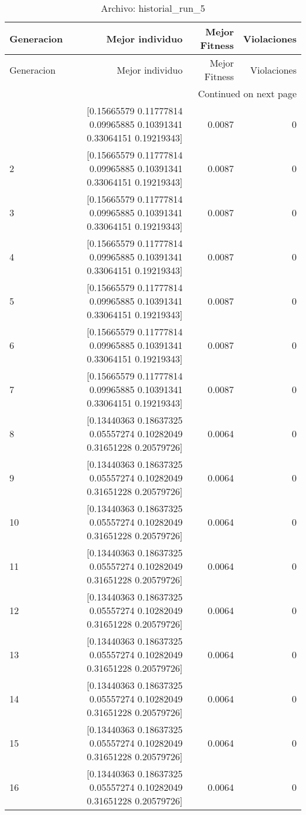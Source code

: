 \begin{longtable}{lrrr}
\caption{Archivo: historial\_run\_5}\label{tab:historial_run_5} \\
\toprule
Generacion & Mejor individuo & Mejor Fitness & Violaciones \\
\midrule
\endfirsthead
\toprule
Generacion & Mejor individuo & Mejor Fitness & Violaciones \\
\midrule
\endhead
\midrule
\multicolumn{4}{r}{Continued on next page} \\
\midrule
\endfoot
\bottomrule
\endlastfoot
1 & [0.15665579 0.11777814 0.09965885 0.10391341 0.33064151 0.19219343] & 0.0087 & 0 \\
2 & [0.15665579 0.11777814 0.09965885 0.10391341 0.33064151 0.19219343] & 0.0087 & 0 \\
3 & [0.15665579 0.11777814 0.09965885 0.10391341 0.33064151 0.19219343] & 0.0087 & 0 \\
4 & [0.15665579 0.11777814 0.09965885 0.10391341 0.33064151 0.19219343] & 0.0087 & 0 \\
5 & [0.15665579 0.11777814 0.09965885 0.10391341 0.33064151 0.19219343] & 0.0087 & 0 \\
6 & [0.15665579 0.11777814 0.09965885 0.10391341 0.33064151 0.19219343] & 0.0087 & 0 \\
7 & [0.15665579 0.11777814 0.09965885 0.10391341 0.33064151 0.19219343] & 0.0087 & 0 \\
8 & [0.13440363 0.18637325 0.05557274 0.10282049 0.31651228 0.20579726] & 0.0064 & 0 \\
9 & [0.13440363 0.18637325 0.05557274 0.10282049 0.31651228 0.20579726] & 0.0064 & 0 \\
10 & [0.13440363 0.18637325 0.05557274 0.10282049 0.31651228 0.20579726] & 0.0064 & 0 \\
11 & [0.13440363 0.18637325 0.05557274 0.10282049 0.31651228 0.20579726] & 0.0064 & 0 \\
12 & [0.13440363 0.18637325 0.05557274 0.10282049 0.31651228 0.20579726] & 0.0064 & 0 \\
13 & [0.13440363 0.18637325 0.05557274 0.10282049 0.31651228 0.20579726] & 0.0064 & 0 \\
14 & [0.13440363 0.18637325 0.05557274 0.10282049 0.31651228 0.20579726] & 0.0064 & 0 \\
15 & [0.13440363 0.18637325 0.05557274 0.10282049 0.31651228 0.20579726] & 0.0064 & 0 \\
16 & [0.13440363 0.18637325 0.05557274 0.10282049 0.31651228 0.20579726] & 0.0064 & 0 \\

\end{longtable}
